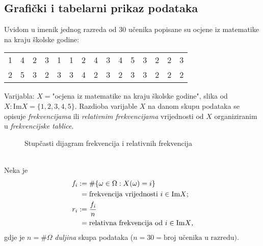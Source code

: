 \documentclass[12pt]{scrartcl}
\newcommand{\im}{\mathrm{Im}}
\begin{document}
\subsection{Grafički i tabelarni prikaz podataka}
\begin{primjer}
Uvidom u imenik jednog razreda od $30$ učenika popisane su ocjene iz matematike na kraju školske godine:
\begin{center}
    \begin{tabular}{ccccccccccccccc}
    1 & 4 & 2 & 3 & 1 & 1 & 2 & 4 & 3 & 4 & 5 & 3 & 2 & 2 & 3 \\
    2 & 5 & 3 & 2 & 3 & 3 & 4 & 2 & 3 & 2 & 3 & 3 & 2 & 2 & 2
    \end{tabular}
\end{center}

Varijabla: $X=$"ocjena iz matematike na kraju školske godine", slika od $X:\im X=\{1,2,3,4,5\}$. Razdioba varijable $X$ na danom skupu podataka se opisuje \emph{frekvencijama} ili \emph{relativnim frekvencijama} vrijednosti od $X$ organiziranim u \emph{frekvencijske tablice}.
\begin{figure}[!ht]
\centering
{}
\caption{Stupčasti dijagram frekvencija i relativnih frekvencija}
\label{fig:frekvirelfrekv}
\end{figure}\\
Neka je
\begin{align}
    f_i &:= \#\{\omega\in\Omega:X(\omega)=i\} \\ 
        &\phantom:= \text{frekvencija vrijednosti } i\in\im X\text;\\
    r_i &:= \dfrac{f_i}{n}\label{eq:ri}\\
        &\phantom:= \text{relativna frekvencija od } i\in\im X\text,
\end{align}
gdje je $n=\#\Omega$ \emph{duljina} skupa podataka ($n=30=\text{broj učenika u razredu)}$.


\end{primjer}
\end{document}
